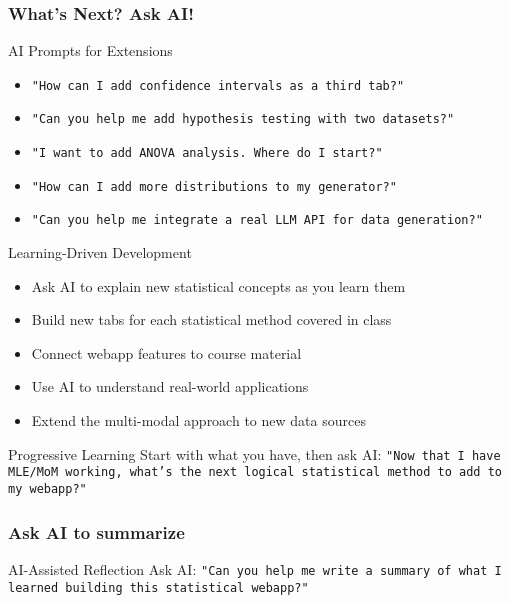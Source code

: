 \documentclass[aspectratio=169]{beamer}
\begin{document}
\begin{frame}
\frametitle{What's Next? Ask AI!}
\begin{alertblock}{AI Prompts for Extensions}
\begin{itemize}
\item \texttt{"How can I add confidence intervals as a third tab?"}
\item \texttt{"Can you help me add hypothesis testing with two datasets?"}
\item \texttt{"I want to add ANOVA analysis. Where do I start?"}
\item \texttt{"How can I add more distributions to my generator?"}
\item \texttt{"Can you help me integrate a real LLM API for data generation?"}
\end{itemize}
\end{alertblock}

\begin{exampleblock}{Learning-Driven Development}
\begin{itemize}
\item Ask AI to explain new statistical concepts as you learn them
\item Build new tabs for each statistical method covered in class
\item Connect webapp features to course material
\item Use AI to understand real-world applications
\item Extend the multi-modal approach to new data sources
\end{itemize}
\end{exampleblock}

\begin{alertblock}{Progressive Learning}
Start with what you have, then ask AI: \texttt{"Now that I have MLE/MoM working, what's the next logical statistical method to add to my webapp?"}
\end{alertblock}
\end{frame}

\begin{frame}
\frametitle{Ask AI to summarize}

\begin{alertblock}{AI-Assisted Reflection}
Ask AI: \texttt{"Can you help me write a summary of what I learned building this statistical webapp?"}
\end{alertblock}
\end{frame}
\end{document}
